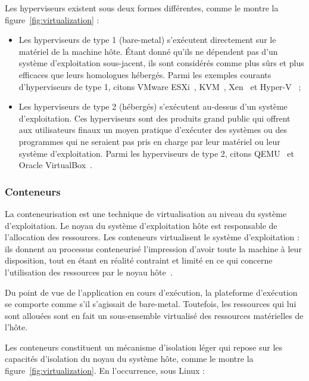 Les hyperviseurs existent sous deux formes différentes, comme le montre la figure~\ref{fig:virtualization} :

\begin{itemize}
    \item Les hyperviseurs de type 1 (bare-metal) s'exécutent directement sur le matériel de la machine hôte. Étant donné qu'ils ne dépendent pas d'un système d'exploitation sous-jacent, ils sont considérés comme plus sûrs et plus efficaces que leurs homologues hébergés. Parmi les exemples courants d'hyperviseurs de type 1, citons VMware ESXi~\cite{esxi}, KVM~\cite{kvm}, Xen~\cite{xen} et Hyper-V~\cite{hyper-v} ;
    \item Les hyperviseurs de type 2 (hébergés) s'exécutent au-dessus d'un système d'exploitation. Ces hyperviseurs sont des produits grand public qui offrent aux utilisateurs finaux un moyen pratique d'exécuter des systèmes ou des programmes qui ne seraient pas pris en charge par leur matériel ou leur système d'exploitation. Parmi les hyperviseurs de type 2, citons QEMU~\cite{qemu} et Oracle VirtualBox~\cite{virtualbox}.
\end{itemize}

\subsubsection{Conteneurs}

La conteneurisation est une technique de virtualisation au niveau du système d'exploitation. Le noyau du système d'exploitation hôte est responsable de l'allocation des ressources. Les conteneurs virtualisent le système d'exploitation : ils donnent au processus conteneurisé l'impression d'avoir toute la machine à leur disposition, tout en étant en réalité contraint et limité en ce qui concerne l'utilisation des ressources par le noyau hôte~\cite{bentalebContainerizationTechnologiesTaxonomies2022}.

Du point de vue de l'application en cours d'exécution, la plateforme d'exécution se comporte comme s'il s'agissait de bare-metal. Toutefois, les ressources qui lui sont allouées sont en fait un sous-ensemble virtualisé des ressources matérielles de l'hôte.

Les conteneurs constituent un mécanisme d'isolation léger qui repose sur les capacités d'isolation du noyau du système hôte, comme le montre la figure~\ref{fig:virtualization}. En l'occurrence, sous Linux :

